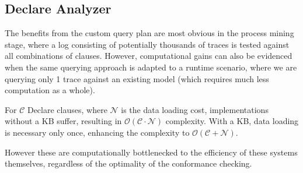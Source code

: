 \subsection{Declare Analyzer}\label{ssec:declan}

The benefits from the custom query plan are most obvious in the process mining stage, where a log consisting of potentially thousands of traces is tested against all combinations of clauses. However, computational gains can also be evidenced when the same querying approach is adapted to a runtime scenario, where we are querying only 1 trace against an existing model (which requires much less computation as a whole).

For $\mathcal{C}$ Declare clauses, where $\mathcal{N}$ is the data loading cost, implementations without a KB suffer, resulting in $\mathcal{O(C \cdot N)}$ complexity. With a KB, data loading is necessary only once, enhancing the complexity to $\mathcal{O(C + N)}$.

However these are computationally bottlenecked to the efficiency of these systems themselves, regardless of the optimality of the conformance checking.

